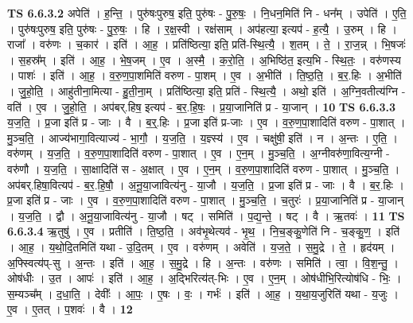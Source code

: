 \documentclass[17pt]{extarticle}
\begin{document}
                  \newline
                                \textbf{ TS 6.6.3.2} \newline
                  अपेति॑ । ह॒न्ति॒ । पुरु॑षःपुरुष॒ इति॒ पुरु॑षः - पु॒रु॒षः॒ । नि॒धन॒मिति॑ नि - धन᳚म् । उपेति॑ । ए॒ति॒ । पुरु॑षःपुरुष॒ इति॒ पुरु॑षः - पु॒रु॒षः॒ । हि । र॒क्ष॒स्वी । रक्ष॑साम् । अप॑हत्या॒ इत्यप॑ - ह॒त्यै॒ । उ॒रुम् । हि । राजा᳚ । वरु॑णः । च॒कार॑ । इति॑ । आ॒ह॒ । प्रति॑ष्ठित्या॒ इति॒ प्रति॑-स्थि॒त्यै॒ । श॒तम् । ते॒ । रा॒ज॒न्न् । भि॒षजः॑ । स॒हस्र᳚म् । इति॑ । आ॒ह॒ । भे॒ष॒जम् । ए॒व । अ॒स्मै॒ । क॒रो॒ति॒ । अ॒भिष्ठि॑त॒ इत्य॒भि - स्थि॒तः॒ । वरु॑णस्य । पाशः॑ । इति॑ । आ॒ह॒ । व॒रु॒ण॒पा॒शमिति॑ वरुण - पा॒शम् । ए॒व । अ॒भीति॑ । ति॒ष्ठ॒ति॒ । ब॒र॒.हिः । अ॒भीति॑ । जु॒हो॒ति॒ । आहु॑तीना॒मित्या - हु॒ती॒ना॒म् । प्रति॑ष्ठित्या॒ इति॒ प्रति॑ - स्थि॒त्यै॒ । अथो॒ इति॑ । अ॒ग्नि॒वतीत्य॑ग्नि - वति॑ । ए॒व । जु॒हो॒ति॒ । अप॑बर्.हिष॒ इत्यप॑ - ब॒र॒.हि॒षः॒ । प्र॒या॒जानिति॑ प्र - या॒जान् । \textbf{  10} \newline
                  \newline
                                \textbf{ TS 6.6.3.3} \newline
                  य॒ज॒ति॒ । प्र॒जा इति॑ प्र - जाः । वै । ब॒र्॒.हिः । प्र॒जा इति॑ प्र-जाः । ए॒व । व॒रु॒ण॒पा॒शादिति॑ वरुण - पा॒शात् । मु॒ञ्च॒ति॒ । आज्य॑भागा॒वित्याज्य॑ - भा॒गौ॒ । य॒ज॒ति॒ । य॒ज्ञ्स्य॑ । ए॒व । चक्षु॑षी॒ इति॑ । न । अ॒न्तः । ए॒ति॒ । वरु॑णम् । य॒ज॒ति॒ । व॒रु॒ण॒पा॒शादिति॑ वरुण - पा॒शात् । ए॒व । ए॒न॒म् । मु॒ञ्च॒ति॒ । अ॒ग्नीवरु॑णा॒वित्य॒ग्नी - वरु॑णौ । य॒ज॒ति॒ । सा॒क्षादिति॑ स - अ॒क्षात् । ए॒व । ए॒न॒म् । व॒रु॒ण॒पा॒शादिति॑ वरुण - पा॒शात् । मु॒ञ्च॒ति॒ । अप॑बर्.हिषा॒वित्यप॑ - ब॒र॒.हि॒षौ॒ । अ॒नू॒या॒जावित्य॑नु - या॒जौ । य॒ज॒ति॒ । प्र॒जा इति॑ प्र - जाः । वै । ब॒र॒.हिः । प्र॒जा इति॑ प्र - जाः । ए॒व । व॒रु॒ण॒पा॒शादिति॑ वरुण - पा॒शात् । मु॒ञ्च॒ति॒ । च॒तुरः॑ । प्र॒या॒जानिति॑ प्र - या॒जान् । य॒ज॒ति॒ । द्वौ । अ॒नू॒या॒जावित्य॑नु - या॒जौ । षट् । समिति॑ । प॒द्य॒न्ते॒ । षट् । वै । ऋ॒तवः॑ । \textbf{  11} \newline
                  \newline
                                \textbf{ TS 6.6.3.4} \newline
                  ऋ॒तुषु॑ । ए॒व । प्रतीति॑ । ति॒ष्ठ॒ति॒ । अव॑भृ॒थेत्यव॑ - भृ॒थ॒ । नि॒च॒ङ्कु॒णेति॑ नि - च॒ङ्कु॒ण॒ । इति॑ । आ॒ह॒ । य॒थो॒दि॒तमिति॑ यथा - उ॒दि॒तम् । ए॒व । वरु॑णम् । अवेति॑ । य॒ज॒ते॒ । स॒मु॒द्रे । ते॒ । हृद॑यम् । अ॒फ्स्वित्य॑प्-सु । अ॒न्तः । इति॑ । आ॒ह॒ । स॒मु॒द्रे । हि । अ॒न्तः । वरु॑णः । समिति॑ । त्वा॒ । वि॒श॒न्तु॒ । ओष॑धीः । उ॒त । आपः॑ । इति॑ । आ॒ह॒ । अ॒द्भिरित्य॑त्-भिः । ए॒व । ए॒न॒म् । ओष॑धीभि॒रित्योष॑धि - भिः॒ । स॒म्यञ्च᳚म् । द॒धा॒ति॒ । देवीः᳚ । आ॒पः॒ । ए॒षः । वः॒ । गर्भः॑ । इति॑ । आ॒ह॒ । य॒था॒य॒जुरिति॑ यथा - य॒जुः । ए॒व । ए॒तत् । प॒शवः॑ । वै । \textbf{  12} \newline
\end{document}
